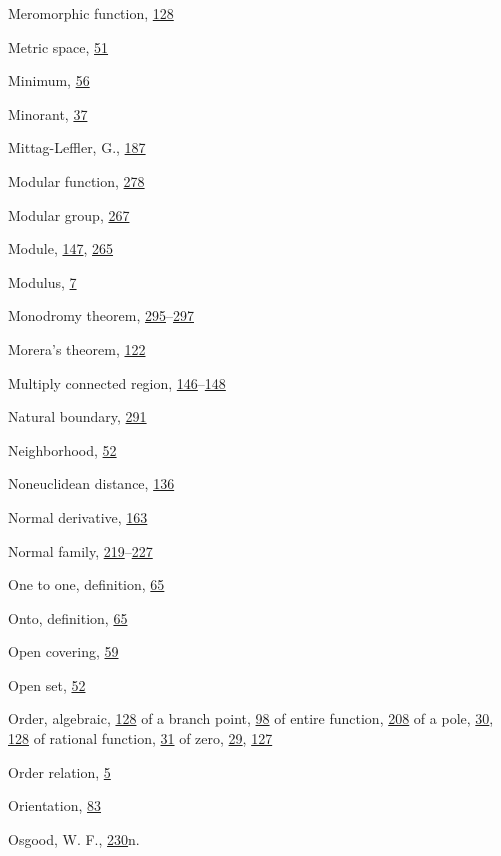 \begin{theindex}
\item Meromorphic function, \hyperlink{orig-p128}{128}
\item Metric space, \hyperlink{orig-p51}{51}
\item Minimum, \hyperlink{orig-p56}{56}
\item Minorant, \hyperlink{orig-p37}{37}
\item Mittag-Leffler, G., \hyperlink{orig-p187}{187}
\item Modular function, \hyperlink{orig-p278}{278}
\item Modular group, \hyperlink{orig-p267}{267}
\item Module, \hyperlink{orig-p147}{147}, \hyperlink{orig-p265}{265}
\item Modulus, \hyperlink{orig-p7}{7}
\item Monodromy theorem, \hyperlink{orig-p295}{295}--\hyperlink{orig-p297}{297}
\item Morera's theorem, \hyperlink{orig-p122}{122}
\item Multiply connected region, \hyperlink{orig-p146}{146}--\hyperlink{orig-p148}{148}
\item Natural boundary, \hyperlink{orig-p291}{291}
\item Neighborhood, \hyperlink{orig-p52}{52}
\item Noneuclidean distance, \hyperlink{orig-p136}{136}
\item Normal derivative, \hyperlink{orig-p163}{163}
\item Normal family, \hyperlink{orig-p219}{219}--\hyperlink{orig-p227}{227}
\item One to one, definition, \hyperlink{orig-p65}{65}
\item Onto, definition, \hyperlink{orig-p65}{65}
\item Open covering, \hyperlink{orig-p59}{59}
\item Open set, \hyperlink{orig-p52}{52}
\item Order, algebraic, \hyperlink{orig-p128}{128}
\subitem of a branch point, \hyperlink{orig-p98}{98}
\subitem of entire function, \hyperlink{orig-p208}{208}
\subitem of a pole, \hyperlink{orig-p30}{30}, \hyperlink{orig-p128}{128}
\subitem of rational function, \hyperlink{orig-p31}{31}
\subitem of zero, \hyperlink{orig-p29}{29}, \hyperlink{orig-p127}{127}
\item Order relation, \hyperlink{orig-p5}{5}
\item Orientation, \hyperlink{orig-p83}{83}
\item Osgood, W. F., \hyperlink{orig-p230}{230}n.

\end{theindex}
